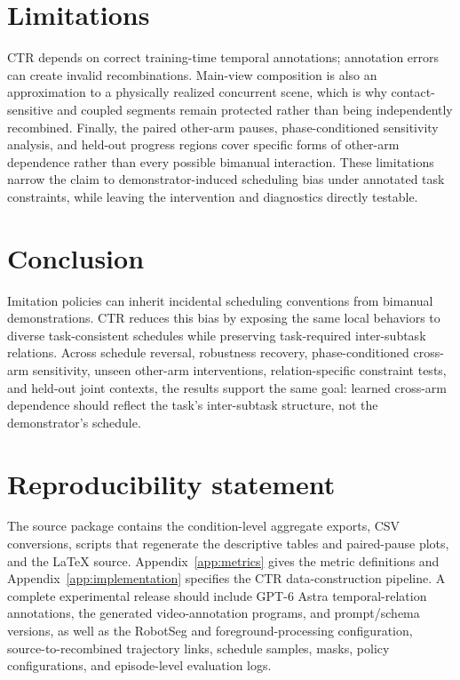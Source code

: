\documentclass{article}
\newcommand{\method}{CTR}
\begin{document}
\section{Limitations}
\method{} depends on correct training-time temporal annotations; annotation errors can create invalid recombinations. Main-view composition is also an approximation to a physically realized concurrent scene, which is why contact-sensitive and coupled segments remain protected rather than being independently recombined. Finally, the paired other-arm pauses, phase-conditioned sensitivity analysis, and held-out progress regions cover specific forms of other-arm dependence rather than every possible bimanual interaction. These limitations narrow the claim to demonstrator-induced scheduling bias under annotated task constraints, while leaving the intervention and diagnostics directly testable.

\section{Conclusion}
Imitation policies can inherit incidental scheduling conventions from bimanual demonstrations. \method{} reduces this bias by exposing the same local behaviors to diverse task-consistent schedules while preserving task-required inter-subtask relations. Across schedule reversal, robustness recovery, phase-conditioned cross-arm sensitivity, unseen other-arm interventions, relation-specific constraint tests, and held-out joint contexts, the results support the same goal: learned cross-arm dependence should reflect the task's inter-subtask structure, not the demonstrator's schedule.
\label{sec:mainend}

\clearpage
\section*{Reproducibility statement}
The source package contains the condition-level aggregate exports, CSV conversions, scripts that regenerate the descriptive tables and paired-pause plots, and the LaTeX source. Appendix~\ref{app:metrics} gives the metric definitions and Appendix~\ref{app:implementation} specifies the \method{} data-construction pipeline. A complete experimental release should include GPT-6 Astra temporal-relation annotations, the generated video-annotation programs, and prompt/schema versions, as well as the RobotSeg and foreground-processing configuration, source-to-recombined trajectory links, schedule samples, masks, policy configurations, and episode-level evaluation logs.
\end{document}
